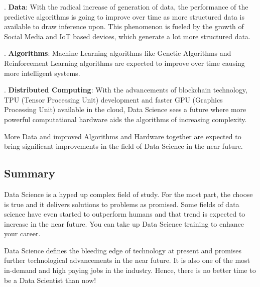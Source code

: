 \documentclass[a4paper, 11pt,twoside=true]{scrartcl}
\begin{document}
. \textbf{Data}: With the radical increase of generation of data, the performance of the predictive algorithms is going to improve over time as more structured data is available to draw inference upon. This phenomenon is fueled by the growth of Social Media and IoT based devices, which generate a lot more structured data.

. \textbf{Algorithms}: Machine Learning algorithms like Genetic Algorithms and Reinforcement Learning algorithms are expected to improve over time causing more intelligent systems.

. \textbf{Distributed Computing}: With the advancements of blockchain technology, TPU (Tensor Processing Unit) development and faster GPU (Graphics Processing Unit) available in the cloud, Data Science sees a future where more powerful computational hardware aids the algorithms of increasing complexity.

\quad More Data and improved Algorithms and Hardware together are expected to bring significant improvements in the field of Data Science in the near future.

\subsection{Summary}
\qquad Data Science is a hyped up complex field of study. For the most part, the choose is true and it delivers solutions to problems as promised. Some fields of data science have even started to outperform humans and that trend is expected to increase in the near future. You can take up Data Science training to enhance your career.

\quad Data Science defines the bleeding edge of technology at present and promises further technological advancements in the near future. It is also one of the most in-demand and high paying jobs in the industry. Hence, there is no better time to be a Data Scientist than now!
\end{document}

